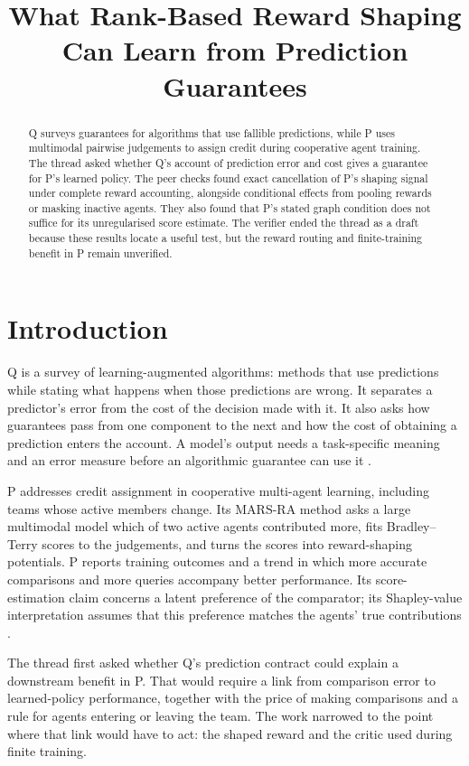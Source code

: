 \documentclass{article}
\title{What Rank-Based Reward Shaping Can Learn from Prediction Guarantees}
\begin{document}
\maketitle

\begin{abstract}
Q surveys guarantees for algorithms that use fallible predictions, while P uses multimodal pairwise judgements
to assign credit during cooperative agent training. The thread asked whether Q's account of prediction error
and cost gives a guarantee for P's learned policy. The peer checks found exact cancellation of P's shaping
signal under complete reward accounting, alongside conditional effects from pooling rewards or masking
inactive agents. They also found that P's stated graph condition does not suffice for its unregularised score
estimate. The verifier ended the thread as a draft because these results locate a useful test, but the reward
routing and finite-training benefit in P remain unverified.
\end{abstract}

\section{Introduction}

Q is a survey of learning-augmented algorithms: methods that use predictions while stating what happens when
those predictions are wrong. It separates a predictor's error from the cost of the decision made with it. It
also asks how guarantees pass from one component to the next and how the cost of obtaining a prediction enters
the account. A model's output needs a task-specific meaning and an error measure before an algorithmic
guarantee can use it \cite{Q}.

P addresses credit assignment in cooperative multi-agent learning, including teams whose active members
change. Its MARS-RA method asks a large multimodal model which of two active agents contributed more, fits
Bradley--Terry scores to the judgements, and turns the scores into reward-shaping potentials. P reports
training outcomes and a trend in which more accurate comparisons and more queries accompany better
performance. Its score-estimation claim concerns a latent preference of the comparator; its Shapley-value
interpretation assumes that this preference matches the agents' true contributions \cite{P}.

The thread first asked whether Q's prediction contract could explain a downstream benefit in P. That would
require a link from comparison error to learned-policy performance, together with the price of making
comparisons and a rule for agents entering or leaving the team. The work narrowed to the point where that link
would have to act: the shaped reward and the critic used during finite training.
\end{document}
